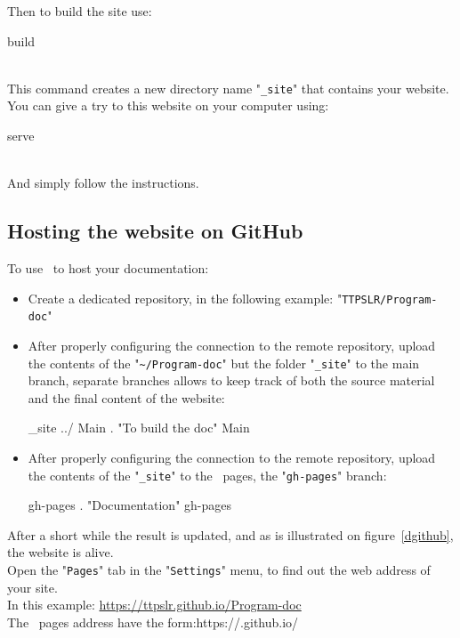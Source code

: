\noindent Then to build the site use:
\begin{script}
    build
\end{script}\\[-0.75cm]
\noindent This command creates a new directory name "\texttt{\_site}" that contains your website. \\ 
\noindent You can give a try to this website on your computer using: 
\begin{script}
    serve
\end{script}\\[-0.75cm]
\noindent And simply follow the instructions.
\newpage

\subsection{Hosting the website on GitHub}

To use \github\ to host your documentation: 
\begin{itemize}
\item Create a dedicated repository, in the following example: "\texttt{TTPSLR/Program-doc}"
\item After properly configuring the connection to the remote repository, upload the contents of the "\texttt{\textasciitilde/Program-doc}" but the folder "\texttt{\_site}" to the main branch, separate branches allows to keep track of both the source material and the final content of the website:
\begin{scripti}
  \_site ../
    Main
   .
    "To build the doc"
    Main
\end{scripti}
\item After properly configuring the connection to the remote repository, upload the contents of the "\texttt{\_site}" to the \github\ pages, the "\texttt{gh-pages}" branch:
\begin{scripti}
    gh-pages
   .
    "Documentation"
    gh-pages
\end{scripti}
\end{itemize}
After a short while the result is updated, and as is illustrated on figure~\ref{dgithub}, the website is alive. \\
Open the "\texttt{Pages}" tab in the "\texttt{Settings}" menu, to find out the web address of your site. \\
In this example: \href{https://ttpslr.github.io/Program-doc}{https://ttpslr.github.io/Program-doc} \\[0.25cm]
The \github\ pages address have the form:\quad https://.github.io/

